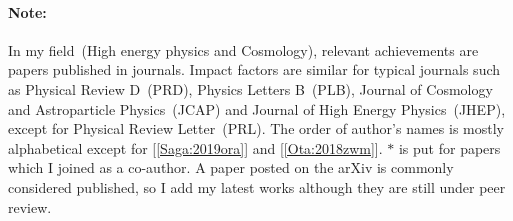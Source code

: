 \documentclass[a4paper]{resume} %
\begin{document}
\paragraph{Note:}
In my field~(High energy physics and Cosmology), relevant achievements are papers published in journals. 
Impact factors are similar for typical journals such as Physical Review D~(PRD), Physics Letters B~(PLB), Journal of Cosmology and Astroparticle Physics~(JCAP) and Journal of High Energy Physics~(JHEP), except for Physical Review Letter~(PRL). 
The order of author's names is mostly alphabetical except for [\ref{Saga:2019ora}] and [\ref{Ota:2018zwm}].
$*$ is put for papers which I joined as a co-author. 
A paper posted on the arXiv is commonly considered published, so I add my latest works %
although they are still under peer review.
\end{document}
